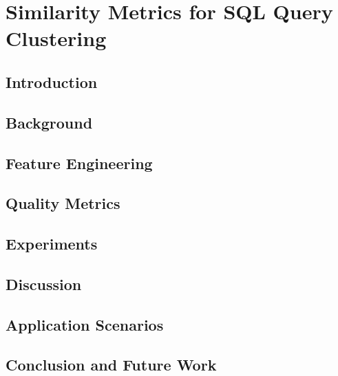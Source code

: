 \chapter{Similarity Metrics for SQL Query Clustering}

\section{Introduction}
\label{sec:introduction}



\section{Background}
\label{sec:background}


\section{Feature Engineering}
\label{sec:system}


\section{Quality Metrics}
\label{sec:dcabench}


\section{Experiments}
\label{sec:experiment}


\section{Discussion}
\label{sec:discussion}


\section{Application Scenarios}
\label{sec:scenarios}


\section{Conclusion and Future Work}
\label{sec:conclusion}
